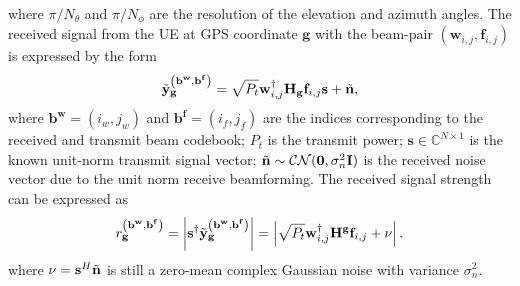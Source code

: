 \documentclass[12pt, draftcls, onecolumn]{IEEEtran}
\theoremstyle{plain}
\newtheorem{lemma}{Lemma}
\theoremstyle{definition}
\theoremstyle{remark}
\newcommand{\nt}[1]{\textcolor{red}{\textbf{[#1]}}}
\begin{document}
where $\pi/N_\theta$ and $\pi/N_\phi$ are the resolution of the elevation and azimuth angles.
The received signal from the UE at GPS coordinate $\mathbf{g}$ with the beam-pair $(\mathbf{w}_{i,j},\mathbf{f}_{i,j})$  is expressed by the form
\begin{equation}
\Tilde{\mathbf y}_{\mathbf{g}}^{\left(\mathbf b^{\mathbf w},\mathbf b^{\mathbf f}\right)}
=\sqrt{P_t}\mathbf{w}_{i,j}^{\dagger}\mathbf{H}_{\mathbf{g}}\mathbf{f}_{i,j}\mathbf s + \Tilde{\mathbf n},
\end{equation}
where $\mathbf b^{\mathbf{w}}=(i_w,j_w)$ and $\mathbf b^{\mathbf{f}}=(i_f,j_f)$ are the indices corresponding to the received and transmit beam codebook;
$P_t$ is the transmit power;
$\mathbf s\in \mathbb{C}^{N\times 1}$ is the known unit-norm transmit signal vector;
$\Tilde{\mathbf n}\sim\mathcal{CN}(\mathbf 0,\sigma_n^2 \mathbf I)$ is the received noise vector due to the unit norm receive beamforming.
The received signal strength can be expressed as
\begin{equation}
\label{eq:rx_pwr}
{r}^{\left(\mathbf b^{\mathbf w},\mathbf b^{\mathbf f}\right)}_{\mathbf g} = \left\vert \mathbf s^\dagger \Tilde{\mathbf y}_{\mathbf{g}}^{\left(\mathbf b^{\mathbf w},\mathbf b^{\mathbf f}\right)} \right\vert = \left\vert \sqrt{P_t}\mathbf{w}_{i,j}^{\dagger}\mathbf{H}^{\mathbf{g}}\mathbf{f}_{i,j} + \nu\right\vert.
\end{equation}
where $\nu=\mathbf s^H \Tilde{\mathbf n}$ is still a zero-mean complex Gaussian noise with variance $\sigma^2_n$.

%		
\end{document}
